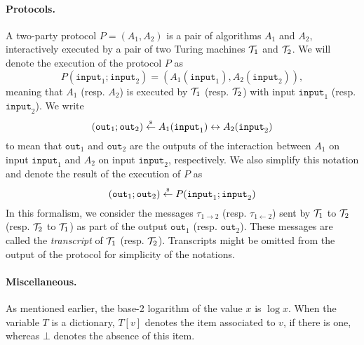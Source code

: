 \paragraph{Protocols.} %
\label{par:def_protocols}
	A two-party protocol $P = (A_1, A_2)$ is a pair of algorithms $A_1$ and $A_2$, interactively executed by a pair of two Turing machines $\mathcal{T}_1$ and $\mathcal{T}_2$. 
	We will denote the execution of the protocol $P$ as 
	\[
		P(\mathtt{input}_1; \mathtt{input}_2) = (A_1(\mathtt{input}_1), A_2(\mathtt{input}_2)),
	\]
	meaning that $A_1$ (resp. $A_2$) is executed by $\mathcal{T}_1$ (resp. $\mathcal{T}_2$) with input $\mathtt{input}_1$ (resp. $\mathtt{input}_2$).
	We write
	\[
		(\mathtt{out}_1; \mathtt{out}_2) \stackrel{\scriptscriptstyle{\$}}{\gets} A_1(\mathtt{input}_1) \leftrightarrow A_2(\mathtt{input}_2)
	\]
	to mean that $\mathtt{out}_1$ and $\mathtt{out}_2$ are the outputs of the interaction between $A_1$ on input $\mathtt{input}_1$ and $A_2$ on input $\mathtt{input}_2$, respectively.
	We also simplify this notation and denote the result of the execution of $P$ as
	\[
		(\mathtt{out}_1; \mathtt{out}_2) \stackrel{\scriptscriptstyle{\$}}{\gets}  P(\mathtt{input}_1; \mathtt{input}_2)
	\]
	In this formalism, we consider the messages $\tau_{1 \rightarrow 2}$ (resp. $\tau_{1 \leftarrow 2}$)  sent by $\mathcal{T}_1$ to $\mathcal{T}_2$ (resp. $\mathcal{T}_2$ to $\mathcal{T}_1$) as part of the output $\mathtt{out}_1$ (resp. $\mathtt{out}_2$).
	These messages are called the \emph{transcript} of $\mathcal{T}_1$ (resp. $\mathcal{T}_2$). 
	Transcripts might be omitted from the output of the protocol for simplicity of the notations.


\paragraph{Miscellaneous.} %
\label{par:def_miscellaneous}
As mentioned earlier, the base-2 logarithm of the value $x$ is $\log x$. 
When the variable $T$ is a dictionary, $T[v]$ denotes the item associated to $v$, if there is one, whereas $\bot$ denotes the absence of this item.


